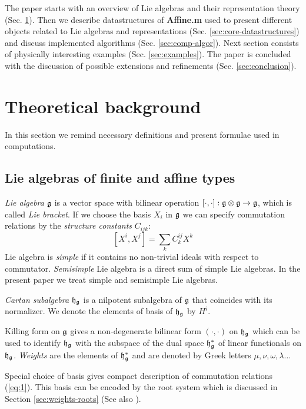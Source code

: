 The paper starts with an overview of Lie algebras and their representation theory (Sec. \ref{sec:theor-backgr}). Then we describe datastructures of {\bf Affine.m} used to present different objects related to Lie algebras and representations (Sec. \ref{sec:core-datastructures}) and discuss implemented algorithms (Sec. \ref{sec:comp-algor}). Next section consists of physically interesting examples (Sec. \ref{sec:examples}). The paper is concluded with the discussion of possible extensions and refinements (Sec. \ref{sec:conclusion}).

\section{Theoretical background}
\label{sec:theor-backgr}

In this section we remind necessary definitions and present formulae used in computations. 

\subsection{Lie algebras of finite and affine types}
\label{sec:lie-algebras-finite}

{\it Lie algebra} $\mathfrak{g}$ is a vector space with bilinear operation $[\cdot,\cdot]:\mathfrak{g}\otimes\mathfrak{g}\to \mathfrak{g}$, which is called {\it Lie bracket}. If we choose the basis $X_{i}$ in $\mathfrak{g}$ we can specify commutation relations by the {\it structure constants} $C_{ijk}$:
\begin{equation}
  \label{eq:1}
  [X^{i},X^{j}]=\sum_{k} C^{ij}_{k} X^{k}
\end{equation}
Lie algebra is {\it simple} if it contains no non-trivial ideals with respect to commutator. {\it Semisimple} Lie algebra is a direct sum of simple Lie algebras. In the present paper we treat simple and semisimple Lie algebras. 

{\it Cartan subalgebra}  $\mathfrak{h}_{\mathfrak{g}}$ is a nilpotent subalgebra of  $\mathfrak{g}$ that coincides with its normalizer. 
We denote the elements of basis of $\mathfrak{h}_{\mathfrak{g}}$ by $H^{i}$.

Killing form on $\mathfrak{g}$ gives a non-degenerate bilinear form $(\cdot,\cdot)$ on $\mathfrak{h}_{\mathfrak{g}}$ which can be used to identify $\mathfrak{h}_{\mathfrak{g}}$ with the subspace of the dual space $\mathfrak{h}_{\mathfrak{g}}^{*}$ of linear functionals on $\mathfrak{h}_{\mathfrak{g}}$. {\it Weights} are the elements of $\mathfrak{h}_{\mathfrak{g}}^{*}$ and are denoted by Greek letters $\mu,\nu, \omega, \lambda\dots$

Special choice of basis gives compact description of commutation relations (\ref{eq:1}). This basis can be encoded by the root system which is discussed in Section \ref{sec:weights-roots} (See also \cite{humphreys1997introduction,humphreys1992reflection}).

